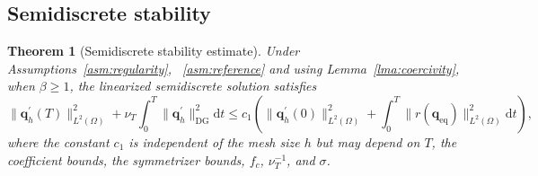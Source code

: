\documentclass[pdflatex,sn-mathphys-num]{sn-jnl}%
\theoremstyle{thmstyleone}%
\newtheorem{theorem}{Theorem}%
\theoremstyle{thmstyletwo}%
\theoremstyle{thmstylethree}%
\begin{document}
\subsection{Semidiscrete stability}

\begin{theorem}[Semidiscrete stability estimate]
\label{th:stability}
Under Assumptions~\ref{asm:regularity}, ~\ref{asm:reference} and using Lemma~\ref{lma:coercivity}, when $\beta \ge 1$, the linearized semidiscrete solution 
satisfies
\begin{equation}
\label{eq:stability}
\|\mathbf{q}_h^{\prime}(T)\|_{L^2(\Omega)}^2
+
\nu_T\int_0^T\|\mathbf{q}_h^{\prime}\|_{\mathrm{DG}}^2 \mathrm{d}t \le
c_1 \left(\|\mathbf{q}^{\prime}_h(0)\|_{L^2(\Omega)}^2
+\int_0^T\|r(\mathbf{q}_{\mathrm{eq}})\|_{L^2(\Omega)}^2 \mathrm{d}t\right),
\end{equation}
where the constant $c_1$ is independent of the mesh size $h$ but may depend on $T$, the coefficient bounds, the symmetrizer bounds, $f_c$, $\nu_T^{-1}$, and $\sigma$.
\end{theorem}
\end{document}
